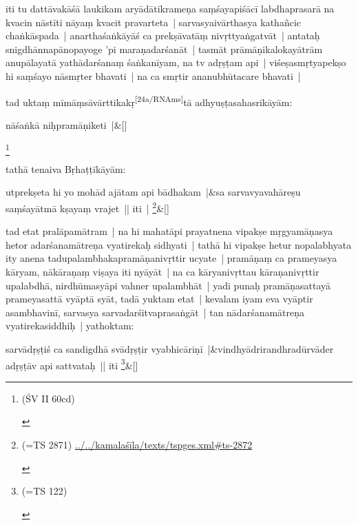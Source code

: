 \documentclass[article,a4paper]{memoir}
\begin{document}
	
	    \pstart
	   iti tu dattā\-vakā\-śā\- laukikam aryā\-dā\-tikrameṇa saṃśayapiśā\-cī\- labdhaprasarā\- na kvacin nā\-stī\-ti nā\-yaṃ kvacit pravarteta | sarvasyaivā\-rthasya kathañcic chaṅkā\-spada | anarthaśaṅkā\-yā\-ś ca prekṣā\-vatā\-ṃ nivṛttyaṅgatvā\-t | antataḥ snigdhā\-nnapā\-nopayoge 'pi maraṇadarśanā\-t | tasmā\-t prā\-mā\-ṇikalokayā\-trā\-m anupā\-layatā\- yathā\-darśanaṃ śaṅkanī\-yam, na tv adṛṣṭam api | viśeṣasmṛtyapekṣo hi saṃśayo nā\-smṛter bhavati | na ca smṛtir ananubhū\-tacare bhavati |
	\pend
      

	  \pstart tad uktaṃ mī\-mā\-ṃsā\-vā\-rttikakṛ\leavevmode\textsuperscript{\rmlatinfont\tiny [24a/RNAms]}tā\- adhyuṣṭasahasrikā\-yā\-m: 
	    \pend
	  
	    
	    \stanza[\smallbreak]
nā\-śaṅkā\- niḥpramā\-ṇiketi |\&[\smallbreak]


	
	    \pstart
	  \footnote{\begin{english}(ŚV II 60cd)\end{english}}
	\pend
      

	  \pstart tathā\- tenaiva Bṛhaṭṭī\-kā\-yā\-m:
	\pend
      
	    
	    \stanza[\smallbreak]
utprekṣeta hi yo mohā\-d ajā\-tam api bā\-dhakam |&sa sarvavyavahā\-reṣu saṃśayā\-tmā\- kṣayaṃ vrajet || iti | \footnote{\begin{english}(=TS 2871) \href{../../kamalaśīla/texts/tsp_ges.xml\#ts-2872}{../../kamalaśī\-la/texts/tsp\textunderscore ges.xml\#ts-2872}\end{english}}\&[\smallbreak]


	

	  \pstart tad etat pralā\-pamā\-tram | na hi mahatā\-pi prayatnena vipakṣe mṛgyamā\-ṇasya hetor adarśanamā\-treṇa vyatirekaḥ sidhyati | tathā\- hi vipakṣe hetur nopalabhyata ity anena tadupalambhakapramā\-ṇanivṛttir ucyate |  pramā\-ṇaṃ ca prameyasya kā\-ryam, nā\-kā\-raṇaṃ viṣaya iti nyā\-yā\-t | na ca kā\-ryanivṛttau kā\-raṇanivṛttir upalabdhā\-, nirdhū\-masyā\-pi vahner upalambhā\-t | yadi punaḥ pramā\-ṇasattayā\- prameyasattā\- vyā\-ptā\- syā\-t, tadā\- yuktam etat | kevalam iyam eva vyā\-ptir asambhavinī\-, sarvasya sarvadarśitvaprasaṅgā\-t | tan nā\-darśanamā\-treṇa vyatirekasiddhiḥ | yathoktam: 
	    \pend
	  
	    
	    \stanza[\smallbreak]
sarvā\-dṛṣṭiś ca sandigdhā\- svā\-dṛṣṭir vyabhicā\-riṇī\- |&vindhyā\-drirandhradū\-rvā\-der adṛṣṭā\-v api sattvataḥ || iti \footnote{\begin{english}(=TS 122)\end{english}}\&[\smallbreak]
\end{document}
